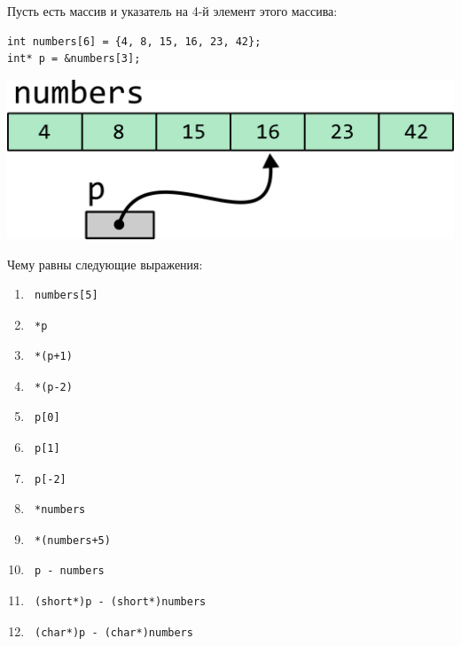 \documentclass{article}
\begin{document}
Пусть есть массив и указатель на 4-й элемент этого массива:
\begin{lstlisting}
int numbers[6] = {4, 8, 15, 16, 23, 42};
int* p = &numbers[3];
\end{lstlisting}

\begin{center}
\includegraphics[scale=0.7]{../images/pointer_task_arithmetics.png}
\end{center}

Чему равны следующие выражения:
\begin{multicols}{3}
\begin{enumerate}
\item \begin{verbatim} numbers[5] \end{verbatim}
\item \begin{verbatim} *p \end{verbatim}
\item \begin{verbatim} *(p+1) \end{verbatim}
\item \begin{verbatim} *(p-2) \end{verbatim}
\item \begin{verbatim} p[0] \end{verbatim}
\item \begin{verbatim} p[1] \end{verbatim}
\item \begin{verbatim} p[-2] \end{verbatim}
\item \begin{verbatim} *numbers \end{verbatim}
\item \begin{verbatim} *(numbers+5) \end{verbatim}
\item \begin{verbatim} p - numbers \end{verbatim}
\item \begin{verbatim} (short*)p - (short*)numbers \end{verbatim}
\item \begin{verbatim} (char*)p - (char*)numbers \end{verbatim}
\end{enumerate}
\end{multicols}
\end{document}
